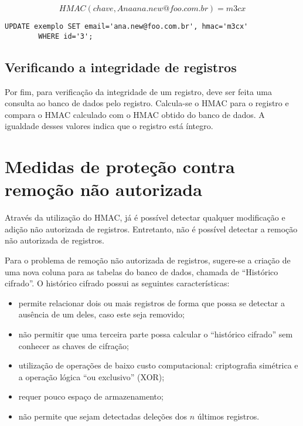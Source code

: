 \begin{equation} \label{eq:hmac-exemplo-2}
    HMAC(chave, Anaana.new@foo.com.br) = m3cx
\end{equation}

\lstset{language=SQL,
	basicstyle=\small,
        breaklines=true,
        numbersep=5pt,
        xleftmargin=.35in,
        xrightmargin=.35in}
\begin{center}
\begin{lstlisting}[label=fonte:exemplo-update, caption=Código SQL para atualizar um registro com HMAC]
    UPDATE exemplo SET email='ana.new@foo.com.br', hmac='m3cx'
    	WHERE id='3';
\end{lstlisting}
\end{center}

\subsection{Verificando a integridade de registros}

Por fim, para verifica\c{c}\~{a}o da integridade de um registro, deve ser feita uma consulta ao banco de dados pelo registro. Calcula-se o \ac{HMAC} para o registro e compara o \ac{HMAC} calculado com o \ac{HMAC} obtido do banco de dados.
A igualdade desses valores indica que o registro está íntegro.

\section{Medidas de prote\c{c}\~{a}o contra remo\c{c}\~{a}o n\~{a}o autorizada}

Atrav\'{e}s da utiliza\c{c}\~{a}o do \ac{HMAC}, j\'{a} \'{e} poss\'{i}vel detectar qualquer modifica\c{c}\~{a}o e adi\c{c}\~{a}o não autorizada de registros.
Entretanto, não é possível detectar a remoção não autorizada de registros.

Para o problema de remoção não autorizada de registros, sugere-se a criação de uma nova coluna para as tabelas do banco de dados, chamada de ``Histórico cifrado''.
O hist\'{o}rico cifrado possui as seguintes caracter\'{i}sticas:

\begin{itemize}
	\item permite relacionar dois ou mais registros de forma que possa se detectar a aus\^{e}ncia de um deles, caso este seja removido;
	\item n\~{a}o permitir que uma terceira parte possa calcular o ``hist\'{o}rico cifrado'' sem conhecer as chaves de cifração;
	\item utiliza\c{c}\~{a}o de opera\c{c}\~{o}es de baixo custo computacional: criptografia sim\'{e}trica e a opera\c{c}\~{a}o l\'{o}gica ``ou exclusivo'' (XOR);
	\item requer pouco espa\c{c}o de armazenamento;
	\item n\~{a}o permite que sejam detectadas dele\c{c}\~{o}es dos $n$ \'{u}ltimos registros.
\end{itemize}

